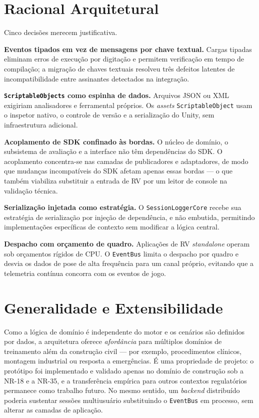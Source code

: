 \section{Racional Arquitetural}

Cinco decisões merecem justificativa.

\textbf{Eventos tipados em vez de mensagens por chave textual.} Cargas tipadas eliminam erros de execução por digitação e permitem verificação em tempo de compilação; a migração de chaves textuais resolveu três defeitos latentes de incompatibilidade entre assinantes detectados na integração.

\textbf{\texttt{ScriptableObjects} como espinha de dados.} Arquivos JSON ou XML exigiriam analisadores e ferramental próprios. Os \textit{assets} \texttt{ScriptableObject} usam o inspetor nativo, o controle de versão e a serialização do Unity, sem infraestrutura adicional.

\textbf{Acoplamento de SDK confinado às bordas.} O núcleo de domínio, o subsistema de avaliação e a interface não têm dependências do SDK. O acoplamento concentra-se nas camadas de publicadores e adaptadores, de modo que mudanças incompatíveis do SDK afetam apenas essas bordas --- o que também viabiliza substituir a entrada de RV por um leitor de console na validação técnica.

\textbf{Serialização injetada como estratégia.} O \texttt{SessionLoggerCore} recebe sua estratégia de serialização por injeção de dependência, e não embutida, permitindo implementações específicas de contexto sem modificar a lógica central.

\textbf{Despacho com orçamento de quadro.} Aplicações de RV \textit{standalone} operam sob orçamentos rígidos de CPU. O \texttt{EventBus} limita o despacho por quadro e desvia os dados de pose de alta frequência para um canal próprio, evitando que a telemetria contínua concorra com os eventos de jogo.

\section{Generalidade e Extensibilidade}

Como a lógica de domínio é independente do motor e os cenários são definidos por dados, a arquitetura oferece \textit{afordância} para múltiplos domínios de treinamento além da construção civil --- por exemplo, procedimentos clínicos, montagem industrial ou resposta a emergências. É uma propriedade de projeto: o protótipo foi implementado e validado apenas no domínio de construção sob a NR-18 e a NR-35, e a transferência empírica para outros contextos regulatórios permanece como trabalho futuro. No mesmo sentido, um \textit{backend} distribuído poderia sustentar sessões multiusuário substituindo o \texttt{EventBus} em processo, sem alterar as camadas de aplicação.
